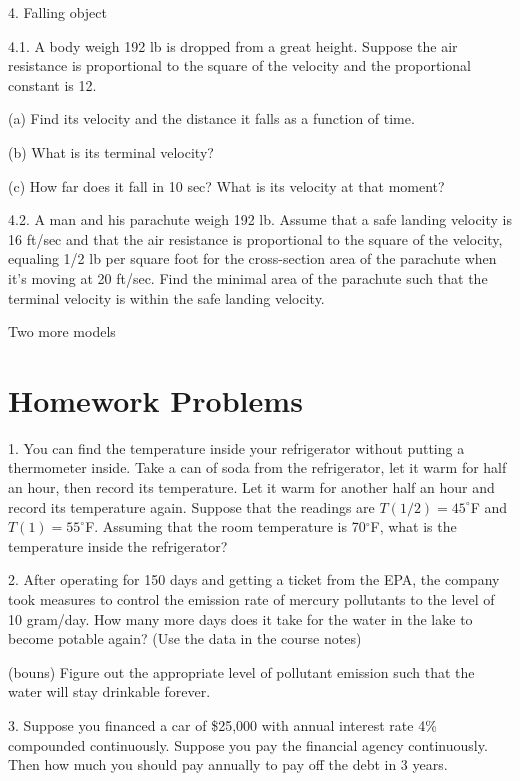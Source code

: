 \documentclass[11pt]{article}
\begin{document}
4. Falling object

4.1. A body weigh 192 lb is dropped from a great height. Suppose the air resistance is proportional to the square of the velocity and the proportional constant is 12. 

(a) Find its velocity and the distance it falls as a function of time. 

(b) What is its terminal velocity?

(c) How far does it fall in 10 sec? What is its velocity at that moment? 

4.2. A man and his parachute weigh 192 lb. Assume that a safe landing velocity is 16 ft/sec and that the air resistance is proportional to the square of the velocity, equaling 1/2 lb per square foot for the cross-section area of the parachute when it's moving at 20 ft/sec. Find the minimal area of the parachute such that the terminal velocity is within the safe landing velocity. 


\newpage

Two more models

\newpage


\section*{Homework Problems}

1. You can find the temperature inside your refrigerator without putting a thermometer inside. Take a can of soda from the refrigerator, let it warm for half an hour, then record its temperature. Let it warm
for another half an hour and record its temperature again. Suppose that the readings are $T(1/2)=45^\circ$F and $T(1) = 55^\circ$F. Assuming that the room temperature is 70$^\circ$F, what is the temperature inside the refrigerator?

2. After operating for 150 days and getting a ticket from the EPA, the company took measures to control the emission rate of mercury pollutants to the level of 10 gram/day. How many more days does it take for the water in the lake to become potable again? (Use the data in the course notes)

(bouns) Figure out the appropriate level of pollutant emission such that the water will stay drinkable forever. 

3. Suppose you financed a car of \$25,000 with annual interest rate 4\% compounded continuously. Suppose you pay the financial agency continuously. Then how much you should pay annually to pay off the debt in 3 years. 
\end{document}
